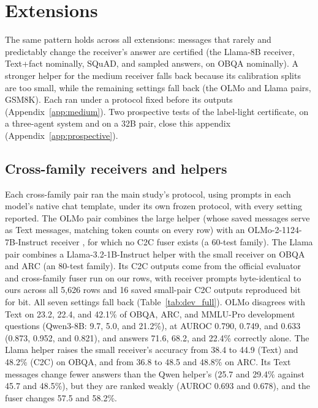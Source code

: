 \section{Extensions}

The same pattern holds across all extensions: messages that rarely and predictably change the receiver's answer are certified (the Llama-8B receiver, Text+fact nominally, SQuAD, and sampled answers, on OBQA nominally). A stronger helper for the medium receiver falls back because its calibration splits are too small, while the remaining settings fall back (the OLMo and Llama pairs, GSM8K). Each ran under a protocol fixed before its outputs (Appendix~\ref{app:medium}). Two prospective tests of the label-light certificate, on a three-agent system and on a 32B pair, close this appendix (Appendix~\ref{app:prospective}).

\subsection{Cross-family receivers and helpers}\label{app:xfam}

Each cross-family pair ran the main study's protocol, using prompts in each model's native chat template, under its own frozen protocol, with every setting reported. The OLMo pair combines the large helper (whose saved messages serve as Text messages, matching token counts on every row) with an OLMo-2-1124-7B-Instruct receiver \citep{olmo2025olmo2}, for which no C2C fuser exists (a 60-test family). The Llama pair combines a Llama-3.2-1B-Instruct helper \citep{grattafiori2024llama3} with the small receiver on OBQA and ARC (an 80-test family). Its C2C outputs come from the official evaluator and cross-family fuser run on our rows, with receiver prompts byte-identical to ours across all 5,626 rows and 16 saved small-pair C2C outputs reproduced bit for bit. All seven settings fall back (Table~\ref{tab:dev_full}). OLMo disagrees with Text on 23.2, 22.4, and 42.1\% of OBQA, ARC, and MMLU-Pro development questions (Qwen3-8B: 9.7, 5.0, and 21.2\%), at AUROC 0.790, 0.749, and 0.633 (0.873, 0.952, and 0.821), and answers 71.6, 68.2, and 22.4\% correctly alone. The Llama helper raises the small receiver's accuracy from 38.4 to 44.9 (Text) and 48.2\% (C2C) on OBQA, and from 36.8 to 48.5 and 48.8\% on ARC. Its Text messages change fewer answers than the Qwen helper's (25.7 and 29.4\% against 45.7 and 48.5\%), but they are ranked weakly (AUROC 0.693 and 0.678), and the fuser changes 57.5 and 58.2\%.

